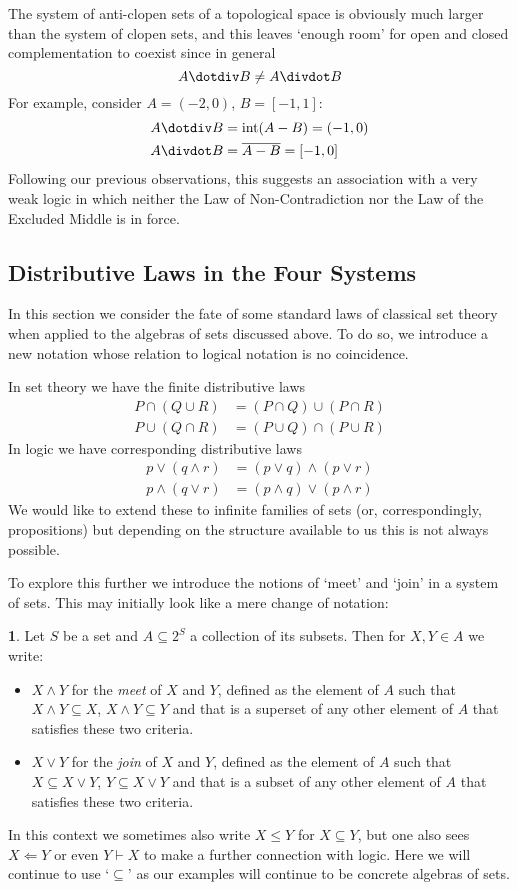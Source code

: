 \documentclass[oneside,english]{article}
\theoremstyle{plain}
\theoremstyle{definition}
\newtheorem{defn}[thm]{\protect\definitionname}
\theoremstyle{definition}
\providecommand{\definitionname}{Definition}
\begin{document}
The system of anti-clopen sets of a topological space is obviously much larger than the system of clopen sets, and this leaves `enough room' for open and closed complementation to coexist since in general
\[
	A\dotdiv B \ne A\divdot B
\]
For example, consider $A = (-2, 0)$, $B = [-1, 1]$:
\[
	\begin{split}
		A\dotdiv B &= \text{int}(A- B) = (-1, 0) \\
		A\divdot B &= \overline{A- B} = [-1, 0]
	\end{split}
\]
Following our previous observations, this suggests an association with a very weak logic in which neither the Law of Non-Contradiction nor the Law of the Excluded Middle is in force.

\subsection{Distributive Laws in the Four Systems}

In this section we consider the fate of some standard laws of classical set theory when applied to the algebras of sets discussed above. To do so, we introduce a new notation whose relation to logical notation is no coincidence.

In set theory we have the finite distributive laws
\[
	\begin{split}
		P\cap (Q\cup R)  &= (P\cap Q)\cup (P\cap R) \\
		P\cup (Q\cap R)  &= (P\cup Q)\cap (P\cup R) 
	\end{split}
\]
In logic we have corresponding distributive laws
\[
	\begin{split}
		p\lor (q\land r)  &= (p\lor q)\land (p\lor r) \\
		p\land (q\lor r)  &= (p\land q)\lor (p\land r) 
	\end{split}
\]
We would like to extend these to infinite families of sets (or, correspondingly, propositions) but depending on the structure available to us this is not always possible.

To explore this further we introduce the notions of `meet' and `join' in a system of sets. This may initially look like a mere change of notation:
\begin{defn}
	Let $S$ be a set and $A\subseteq 2^S$ a collection of its subsets. Then for $X, Y\in A$ we write: 
	\begin{itemize}
		\item $X\land Y$ for the \emph{meet} of $X$ and $Y$, defined as the element of $A$ such that $X\land Y\subseteq X$, $X\land Y\subseteq Y$ and that is a superset of any other element of $A$ that satisfies these two criteria.
		\item $X\lor Y$ for the \emph{join} of $X$ and $Y$, defined as the element of $A$ such that $X\subseteq X\lor Y$, $Y\subseteq X\lor Y$ and that is a subset of any other element of $A$ that satisfies these two criteria.
	\end{itemize}
\end{defn}
In this context we sometimes also write $X\le Y$ for $X\subseteq Y$, but one also sees $X\Leftarrow Y$ or even $Y\vdash X$ to make a further connection with logic. Here we will continue to use `$\subseteq$' as our examples will continue to be concrete algebras of sets.
\end{document}
